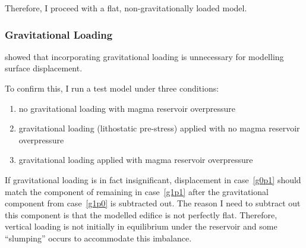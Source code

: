 Therefore, I proceed with a flat, non-gravitationally loaded model.

\subsubsection{Gravitational Loading}

\textcite{grosfils_magma_2007} showed that incorporating gravitational loading is unnecessary for modelling surface displacement.

To confirm this, I run a test model under three conditions:
\begin{enumerate}
    \item no gravitational loading with magma reservoir overpressure \label{g0p1}
    \item gravitational loading (lithostatic pre-stress) applied with no magma reservoir overpressure\label{g1p0}
    \item gravitational loading applied with magma reservoir overpressure \label{g1p1}
\end{enumerate}
If gravitational loading is in fact insignificant, displacement in case~\ref{g0p1} should match the component of remaining in case~\ref{g1p1} after the gravitational component from case~\ref{g1p0} is subtracted out. The reason I need to subtract out this component is that the modelled edifice is not perfectly flat. Therefore, vertical loading is not initially in equilibrium under the reservoir and some ``slumping'' occurs to accommodate this imbalance.

